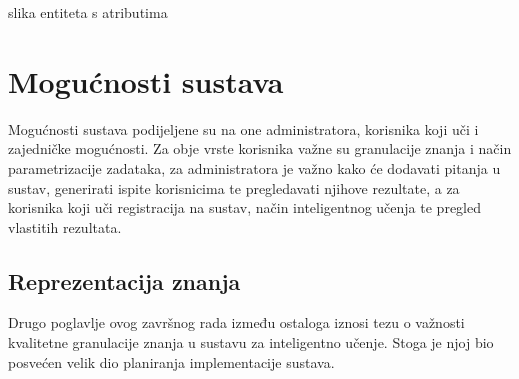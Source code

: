 \documentclass[times, utf8, zavrsni, numeric]{fer}
\begin{document}
\pagebreak

slika entiteta s atributima

\pagebreak
\section{Mogućnosti sustava}
Mogućnosti sustava podijeljene su na one administratora, korisnika koji uči i zajedničke mogućnosti. Za obje vrste korisnika važne su granulacije znanja i način parametrizacije zadataka, za administratora je važno kako će dodavati pitanja u sustav, generirati ispite korisnicima te pregledavati njihove rezultate, a za korisnika koji uči registracija na sustav, način inteligentnog učenja te pregled vlastitih rezultata.

\subsection{Reprezentacija znanja}
Drugo poglavlje ovog završnog rada između ostaloga iznosi tezu o važnosti kvalitetne granulacije znanja u sustavu za inteligentno učenje. Stoga je njoj bio posvećen velik dio planiranja implementacije sustava. 
\end{document}
